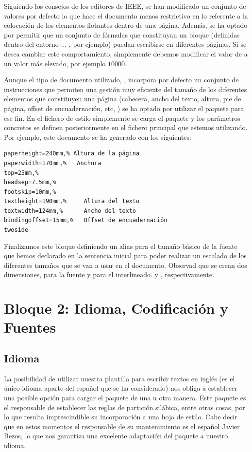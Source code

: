 Siguiendo los consejos de los editores de IEEE, se han modificado un conjunto de valores por defecto lo que hace el documento menos restrictivo en lo referente a la colocación de los elementos flotantes dentro de una página. Además, se ha optado por permitir que un conjunto de fórmulas que constituyan un bloque (definidas dentro del entorno  ... , por ejemplo) puedan escribirse en diferentes páginas. Si se desea cambiar este comportamiento, simplemente debemos modificar el valor de  a un valor más elevado, por ejemplo $10000$.

Aunque el tipo de documento utilizado, , incorpora por defecto un conjunto de instrucciones que permiten una gestión muy eficiente del tamaño de los diferentes elementos que constituyen una página (cabecera, ancho del texto, altura, pie de página, offset de encuadernación, etc, ) se ha optado por utilizar el paquete  para ese fin. En el fichero de estilo simplemente se carga el paquete y los parámetros concretos se definen posteriormente en el fichero principal que estemos utilizando. Por ejemplo, este documento se ha generado con los siguientes:

\begin{lstlisting}[rulecolor=\color{white}]
paperheight=240mm,% Altura de la página
paperwidth=170mm,%   Anchura
top=25mm,%
headsep=7.5mm,%
footskip=10mm,%
textheight=190mm,%     Altura del texto
textwidth=124mm,%      Ancho del texto
bindingoffset=15mm,%   Offset de encuadernación
twoside
\end{lstlisting}

Finalizamos este bloque definiendo un alias para el tamaño básico de la fuente que hemos declarado en la sentencia inicial para poder realizar un escalado de los diferentes tamaños que se van a usar en el documento. Observad que se crean dos dimensiones, para la fuente y para el interlineado.  y , respectivamente.

\section{Bloque 2: Idioma, Codificación y Fuentes}
\subsection{Idioma}
La posibilidad de utilizar nuestra plantilla para escribir textos en inglés (es el único idioma aparte del español que se ha considerado) nos obliga a establecer una posible opción para cargar el paquete  de una u otra manera. Este paquete es el responsable de establecer las reglas de partición silábica, entre otras cosas, por lo que resulta imprescindible su incorporación a una hoja de estilo. Cabe decir que en estos momentos el responsable de su mantenimiento es el español Javier Bezos, lo que nos garantiza una excelente adaptación del paquete a nuestro idioma.

